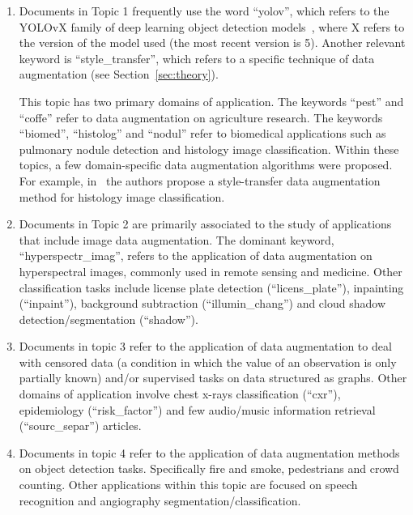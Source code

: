 \documentclass[parskip=full]{scrartcl}
\begin{document}
\begin{enumerate}
    \item Documents in Topic 1 frequently use the word ``yolov'', which refers
        to the YOLOvX family of deep learning object detection
        models~\cite{Redmon2015}, where X refers to the version of the model
        used (the most recent version is 5). Another relevant keyword is
        ``style\_transfer'', which refers to a specific technique of data
        augmentation (see Section~\ref{sec:theory}).

        This topic has two primary domains of application. The keywords
        ``pest'' and ``coffe'' refer to data augmentation on agriculture
        research. The keywords ``biomed'', ``histolog'' and ``nodul'' refer to
        biomedical applications such as pulmonary nodule detection and
        histology image classification. Within these topics, a few
        domain-specific data augmentation algorithms were proposed. For
        example, in~\cite{Cicalese2020} the authors propose a style-transfer
        data augmentation method for histology image classification.  

    \item Documents in Topic 2 are primarily associated to the study of
        applications that include image data augmentation. The dominant
        keyword, ``hyperspectr\_imag'', refers to the application of data
        augmentation on hyperspectral images, commonly used in remote sensing
        and medicine. Other classification tasks include license plate
        detection (``licens\_plate''), inpainting (``inpaint''), background
        subtraction (``illumin\_chang'') and cloud shadow
        detection/segmentation (``shadow'').
    
    \item Documents in topic 3 refer to the application of data augmentation
        to deal with censored data (a condition in which the value of an
        observation is only partially known) and/or supervised tasks on data
        structured as graphs. Other domains of application involve chest
        x-rays classification (``cxr''), epidemiology (``risk\_factor'') and
        few audio/music information retrieval (``sourc\_separ'') articles.

    \item Documents in topic 4 refer to the application of data augmentation
        methods on object detection tasks. Specifically fire and smoke,
        pedestrians and crowd counting. Other applications within this topic
        are focused on speech recognition and angiography
        segmentation/classification.


\end{enumerate}
\end{document}
